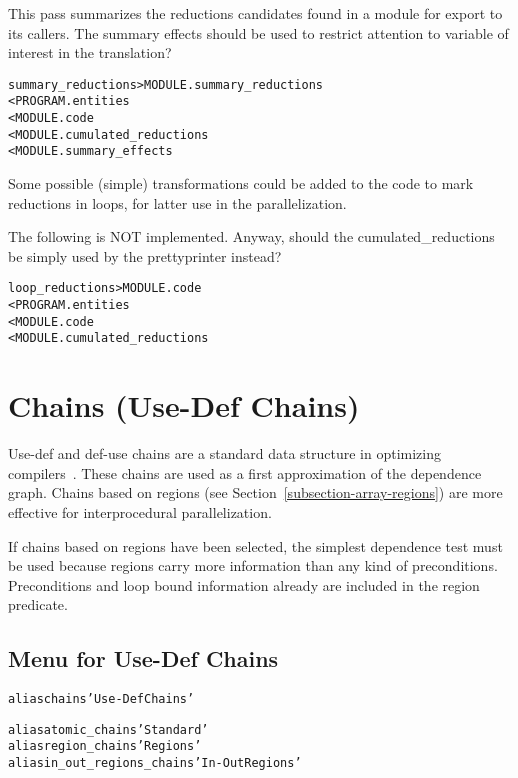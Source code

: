 \documentclass[a4paper]{report}
\newenvironment{PipsMake}{\begin{alltt}}{\end{alltt}}
\begin{document}
This pass summarizes the reductions candidates found in a module for
export to its callers. The summary effects should be used to restrict
attention to variable of interest in the translation?

\begin{PipsMake}
summary_reductions > MODULE.summary_reductions
  < PROGRAM.entities
  < MODULE.code
  < MODULE.cumulated_reductions
  < MODULE.summary_effects
\end{PipsMake}

Some possible (simple) transformations could be added to the code to mark
reductions in loops, for latter use in the parallelization.

The following is NOT implemented. Anyway, should the cumulated\_reductions
be simply used by the prettyprinter instead?
\begin{PipsMake}
loop_reductions > MODULE.code
  < PROGRAM.entities
  < MODULE.code
  < MODULE.cumulated_reductions
\end{PipsMake}


\section{Chains (Use-Def Chains)}
\label{subsection-chains}

Use-def and def-use chains are a standard data structure in optimizing
compilers~\cite{Aho86}. These chains are used as a first approximation of
the dependence graph. Chains based on regions (see
Section~\ref{subsection-array-regions}) are more effective for
interprocedural parallelization.

If chains based on regions have been selected, the simplest dependence
test must be used because regions carry more information than any kind
of preconditions. Preconditions and loop bound information already are
included in the region predicate.

\subsection{Menu for Use-Def Chains}

\begin{PipsMake}
alias chains 'Use-Def Chains'

alias atomic_chains 'Standard'
alias region_chains 'Regions'
alias in_out_regions_chains 'In-Out Regions'
\end{PipsMake}
\end{document}
